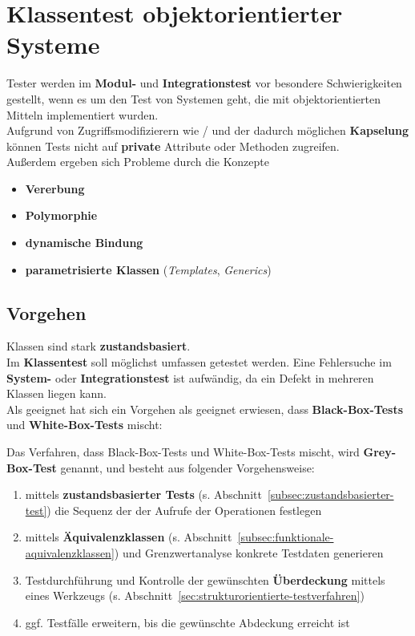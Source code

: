 \section{Klassentest objektorientierter Systeme}\label{sec:klassentest-objektorientierter-systeme}
Tester werden im \textbf{Modul-} und \textbf{Integrationstest} vor besondere Schwierigkeiten gestellt, wenn es um den Test von Systemen geht, die mit objektorientierten Mitteln implementiert wurden.\\
Aufgrund von Zugriffsmodifizierern wie  /  und der dadurch möglichen \textbf{Kapselung} können Tests nicht auf \textbf{private} Attribute oder Methoden zugreifen.\\
Außerdem ergeben sich Probleme durch die Konzepte

\begin{itemize}
    \item \textbf{Vererbung}
    \item \textbf{Polymorphie}
    \item \textbf{dynamische Bindung}
    \item \textbf{parametrisierte Klassen} (\textit{Templates}, \textit{Generics})
\end{itemize}

\subsection*{Vorgehen}
Klassen sind stark \textbf{zustandsbasiert}.\\
Im \textbf{Klassentest} soll möglichst umfassen getestet werden.
Eine Fehlersuche im \textbf{System-} oder \textbf{Integrationstest} ist aufwändig, da ein Defekt in mehreren Klassen liegen kann.\\
Als geeignet hat sich ein Vorgehen als geeignet erwiesen, dass \textbf{Black-Box-Tests} und \textbf{White-Box-Tests} mischt:

\begin{tcolorbox}[title=Grey-Box-Test]
    Das Verfahren, dass Black-Box-Tests und White-Box-Tests mischt, wird \textbf{Grey-Box-Test} genannt, und besteht aus folgender Vorgehensweise:
    \begin{enumerate}
        \item mittels \textbf{zustandsbasierter Tests} (s. Abschnitt~\ref{subsec:zustandsbasierter-test}) die Sequenz der der Aufrufe der Operationen festlegen
        \item mittels \textbf{Äquivalenzklassen} (s. Abschnitt~\ref{subsec:funktionale-aquivalenzklassen}) und Grenzwertanalyse konkrete Testdaten generieren
        \item Testdurchführung und Kontrolle der gewünschten \textbf{Überdeckung} mittels eines Werkzeugs (s. Abschnitt~\ref{sec:strukturorientierte-testverfahren})
        \item ggf. Testfälle erweitern, bis die gewünschte Abdeckung erreicht ist
    \end{enumerate}
\end{tcolorbox}

